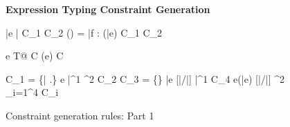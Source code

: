 \begin{figure*}[t!]

  \textbf{Expression Typing Constraint Generation} \; 
\\

\beginrules

  {
    \exprok {\stdcontext} {\bar{e}} {\bar{\tau}} {C_1}
    \spc
    \typeok {\A} {\fbN} {C_2}
    \spc
    \fields(\fbN) = \bar{f} : \taubar
  }
  {
    \exprok {\stdcontext}   { \fbN(\bar{e})} {\fbN} {C_1 \cup C_2}
  }

  {
   \exprok {\stdcontext} {e} {\inang{\rho} \unitZ \xrightarrow{\rgn} T@\rho} {C}
  }
  {
    \exprok {\stdcontext} {\; \RgnZ{} \inang{\toprgn} (e)}  {\RgnZ{} \inang{\toprgn}} {C}
  }



{
C_1 = \{\bar{\pi} \in \A.\rhoenv\} \spc
\exprok {\stdcontext} {e} {\inang{\rhobar\,|\,\phi}\bar{\tau^1} \xrightarrow{\rgn} \tau^2} {C_2}
\nl
C_3 = \{\} \spc
\exprok {\stdcontext} {\bar{e}} {[\bar{\pi}/\bar{\rho}] \bar{\tau^1}} {C_4}
}{
\exprok {\stdcontext} {e\inang{\bar{\pi}}(\bar{e})} {[\bar{\pi}/\bar{\rho}] \tau^2} {\cup_{i=1}^4 C_i}
}


\myendrules

\caption{Constraint generation rules: Part 1}
\label{fig:constraint-gen-0}
\end{figure*}

